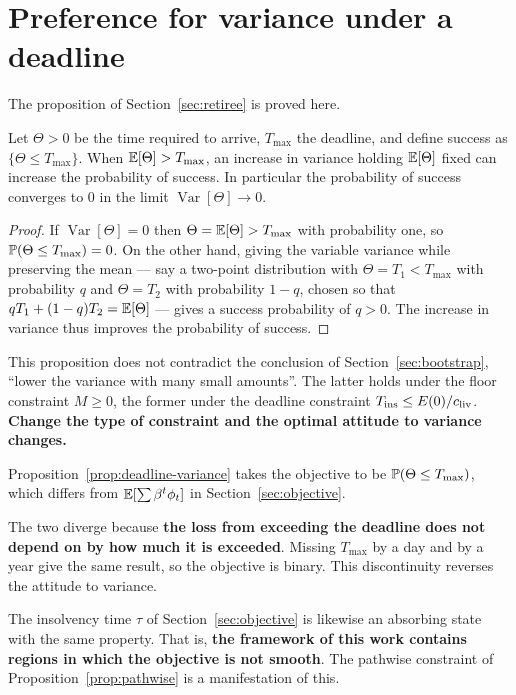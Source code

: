 \section{Preference for variance under a deadline}

The proposition of Section~\ref{sec:retiree} is proved here.

\begin{proposition}
\label{prop:deadline-variance}
Let $\Theta>0$ be the time required to arrive, $T_{\max}$ the deadline, and define success as
$\{\Theta \leq T_{\max}\}$. When $\mathbb{E}[\Theta] > T_{\max}$, an increase in variance holding
$\mathbb{E}[\Theta]$ fixed can increase the probability of success. In particular the probability of
success converges to $0$ in the limit $\operatorname{Var}[\Theta]\to 0$.
\end{proposition}

\begin{proof}
If $\operatorname{Var}[\Theta]=0$ then $\Theta = \mathbb{E}[\Theta] > T_{\max}$ with probability one, so
$\mathbb{P}(\Theta\leq T_{\max})=0$. On the other hand, giving the variable variance while preserving
the mean — say a two-point distribution with $\Theta=T_1<T_{\max}$ with probability $q$ and
$\Theta=T_2$ with probability $1-q$, chosen so that $qT_1+(1-q)T_2=\mathbb{E}[\Theta]$ — gives a success
probability of $q>0$. The increase in variance thus improves the probability of success.
\end{proof}

\begin{remark}
This proposition does not contradict the conclusion of Section~\ref{sec:bootstrap}, ``lower the
variance with many small amounts''. The latter holds under the floor constraint $M\geq 0$, the
former under the deadline constraint $T_{\mathrm{ins}} \leq E(0)/c_{\rm liv}$. \textbf{Change the type of
constraint and the optimal attitude to variance changes.}
\end{remark}

\begin{remark}
\label{rem:deadline-objective}
Proposition~\ref{prop:deadline-variance} takes the objective to be
$\mathbb{P}(\Theta\leq T_{\max})$, which differs from $\mathbb{E}[\sum\beta^t\phi_t]$ in
Section~\ref{sec:objective}.

The two diverge because \textbf{the loss from exceeding the deadline does not depend on by how
much it is exceeded}. Missing $T_{\max}$ by a day and by a year give the same result, so the
objective is binary. This discontinuity reverses the attitude to variance.

The insolvency time $\tau$ of Section~\ref{sec:objective} is likewise an absorbing state with the
same property. That is, \textbf{the framework of this work contains regions in which the
objective is not smooth}. The pathwise constraint of Proposition~\ref{prop:pathwise} is a
manifestation of this.
\end{remark}

